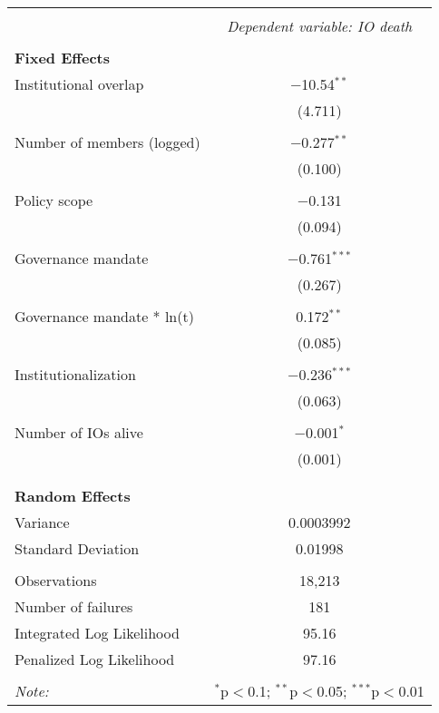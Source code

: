 \documentclass[12pt]{article}
\begin{document}
\begin{table}[H] 
\centering 
\footnotesize
\label{tab:coxme_model} 
\begin{tabular}{@{\extracolsep{5pt}}lc} 
\\[-1.8ex]\hline 
\hline \\[-1.8ex] 
 & \multicolumn{1}{c}{\textit{Dependent variable: IO death}} \\ 
\hline \\[-1.8ex] 
\textbf{Fixed Effects} &  \\ 
Institutional overlap & $-$10.54$^{**}$ \\ 
  & (4.711) \\ 
  & \\ 
Number of members (logged) & $-$0.277$^{**}$ \\ 
  & (0.100) \\ 
  & \\ 
Policy scope & $-$0.131 \\ 
  & (0.094) \\ 
  & \\ 
Governance mandate & $-$0.761$^{***}$ \\ 
  & (0.267) \\ 
  & \\ 
Governance mandate * ln(t) & 0.172$^{**}$ \\ 
  & (0.085) \\ 
  & \\ 
Institutionalization & $-$0.236$^{***}$ \\ 
  & (0.063) \\ 
  & \\ 
Number of IOs alive & $-$0.001$^{*}$ \\ 
  & (0.001) \\ 
  & \\ 
\hline \\[-1.8ex] 
\textbf{Random Effects} &  \\ 
Variance & 0.0003992 \\ 
Standard Deviation & 0.01998 \\ 
\hline \\[-1.8ex] 
Observations & 18,213 \\ 
Number of failures & 181 \\ 
Integrated Log Likelihood & 95.16 \\ 
Penalized Log Likelihood & 97.16 \\ 
\hline 
\hline \\[-1.8ex] 
\textit{Note:} & \multicolumn{1}{r}{$^{*}$p$<$0.1; $^{**}$p$<$0.05; $^{***}$p$<$0.01} \\ 
\end{tabular} 
\end{table} 
\end{document}
